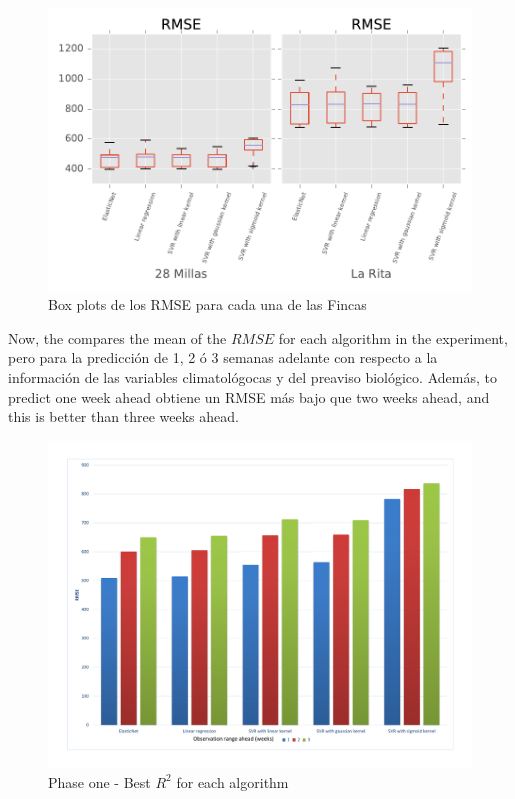 %
\begin{figure}[H] 
 \centering
 \includegraphics[scale=.8]{Usado_2017-04-30_Sigatoka_RMSE_Boxplot}
 \caption{Box plots de los RMSE para cada una de las Fincas} 
 \label{figura4} 
\end{figure}
%
Now, the  compares the mean of the $RMSE$ for each algorithm in the experiment, pero para la predicción de 1, 2 ó 3 semanas adelante con respecto a la información de las variables climatológocas y del preaviso biológico. Además, to predict one week ahead obtiene un RMSE más bajo que  two weeks ahead, and this is better than three weeks ahead. 
%
\begin{figure}[H] 
 \centering
 \includegraphics[scale=.5]{Usado_Algorithms-RMSE}
 \caption{Phase one - Best $R^2$ for each algorithm} 
 \label{figura5} 
\end{figure}

